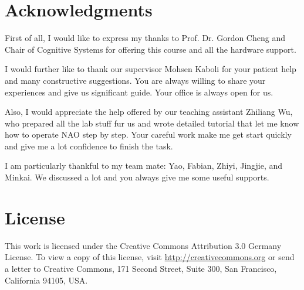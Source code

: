 \documentclass[ICS, PP, english, final]{ICS_thesis}
\begin{document}
\pagestyle{fancy}

\tableofcontents






% 	

\cleardoublepage
\chapter*{Acknowledgments}
First of all, I would like to express my thanks to Prof. Dr. Gordon Cheng and Chair of Cognitive Systems for offering this course and all the hardware support.

I would further like to thank our supervisor Mohsen Kaboli for your patient help and many constructive suggestions. You are always willing to share your experiences and give us significant guide. Your office is always open for us.

Also, I would appreciate the help offered by our teaching assistant Zhiliang Wu, who prepared all the lab stuff fur us and wrote detailed tutorial that let me know how to operate NAO step by step. Your careful work make me get start quickly and give me a lot confidence to finish the task. 

I am particularly thankful to my team mate: Yao, Fabian, Zhiyi, Jingjie, and Minkai. We discussed a lot and you always give me some useful supports.

\cleardoublepage
{}
\listoffigures

% 

\cleardoublepage
{}



\cleardoublepage
\chapter*{License}
This work is licensed under the Creative Commons Attribution 3.0 Germany
License. To view a copy of this license,
visit \href{http://creativecommons.org/licenses/by/3.0/de/}{http://creativecommons.org} or send a letter
to Creative Commons, 171 Second Street, Suite 300, San
Francisco, California 94105, USA.
\end{document}
